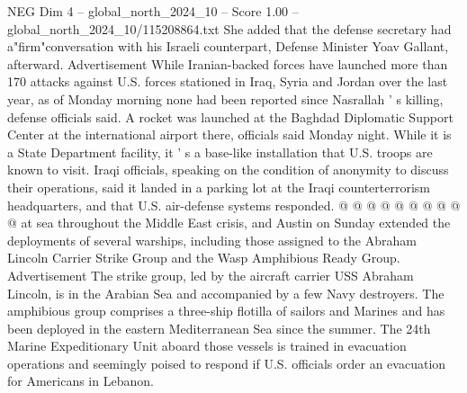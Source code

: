 \begin{textsample}{NEG Dim 4 – global\_north\_2024\_10 – Score 1.00 – global\_north\_2024\_10/115208864.txt}
She added that the defense secretary had a"firm"conversation with his Israeli counterpart, Defense Minister Yoav Gallant, afterward.
Advertisement While Iranian-backed forces have launched more than 170 attacks against U.S. forces stationed in Iraq, Syria and Jordan over the last year, as of Monday morning none had been reported since Nasrallah ' s killing, defense officials said.
A rocket was launched at the Baghdad Diplomatic Support Center at the international airport there, officials said Monday night.
While it is a State Department facility, it ' s a base-like installation that U.S. troops are known to visit.
Iraqi officials, speaking on the condition of anonymity to discuss their operations, said it landed in a parking lot at the Iraqi counterterrorism headquarters, and that U.S. air-defense systems responded. @ @ @ @ @ @ @ @ @ @ at sea throughout the Middle East crisis, and Austin on Sunday extended the deployments of several warships, including those assigned to the Abraham Lincoln Carrier Strike Group and the Wasp Amphibious Ready Group.
Advertisement The strike group, led by the aircraft carrier USS Abraham Lincoln, is in the Arabian Sea and accompanied by a few Navy destroyers.
The amphibious group comprises a three-ship flotilla of sailors and Marines and has been deployed in the eastern Mediterranean Sea since the summer.
The 24th Marine Expeditionary Unit aboard those vessels is trained in evacuation operations and seemingly poised to respond if U.S. officials order an evacuation for Americans in Lebanon.

\end{textsample}

